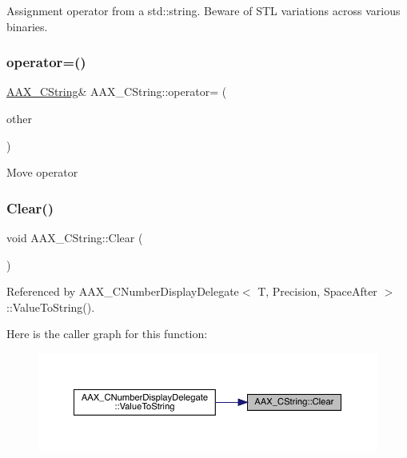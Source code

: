 Assignment operator from a std\+::string. Beware of S\+TL variations across various binaries. \mbox{\label{a01573_a1b9dad34f5acb197595c69373193f794}} 
\subsubsection{\texorpdfstring{operator=()}{operator=()}\hspace{0.1cm}{\footnotesize\ttfamily [5/5]}}
{\footnotesize\ttfamily \mbox{\hyperlink{a01573}{A\+A\+X\+\_\+\+C\+String}}\& A\+A\+X\+\_\+\+C\+String\+::operator= (\begin{DoxyParamCaption}\item[{\mbox{\hyperlink{a01573}{A\+A\+X\+\_\+\+C\+String}} \&\&}]{other }\end{DoxyParamCaption})}

Move operator \mbox{\label{a01573_a866d456c7cad181d1feda559a0ca3d07}} 
\subsubsection{\texorpdfstring{Clear()}{Clear()}}
{\footnotesize\ttfamily void A\+A\+X\+\_\+\+C\+String\+::\+Clear (\begin{DoxyParamCaption}{ }\end{DoxyParamCaption})}



Referenced by A\+A\+X\+\_\+\+C\+Number\+Display\+Delegate$<$ T, Precision, Space\+After $>$\+::\+Value\+To\+String().

Here is the caller graph for this function\+:
\nopagebreak
\begin{figure}[H]
\begin{center}
\leavevmode
\includegraphics[width=350pt]{a01573_a866d456c7cad181d1feda559a0ca3d07_icgraph}
\end{center}
\end{figure}
\mbox{\label{a01573_a464d3585163efb0cc4b3169ffc5f7101}} 

